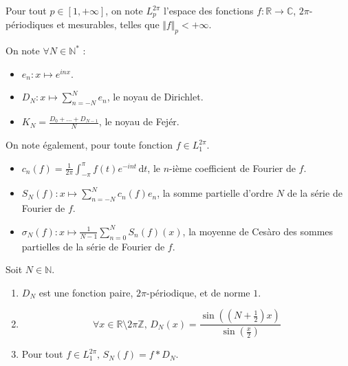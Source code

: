 





	\begin{notation}
		Pour tout $p \in [1, +\infty]$, on note $L_p^{2\pi}$ l'espace des fonctions $f : \mathbb{R} \rightarrow \mathbb{C}$, $2\pi$-périodiques et mesurables, telles que $\Vert f \Vert_p < +\infty$.
	\end{notation}

	\begin{notation}
		On note $\forall N \in \mathbb{N}^*$ :
		\begin{itemize}
			\item $e_n : x \mapsto e^{inx}$.
			\item $D_N : x \mapsto \sum_{n=-N}^N e_n$, le noyau de Dirichlet.
			\item $K_N = \frac{D_0 + \dots + D_{N-1}}{N}$, le noyau de Fejér.
		\end{itemize}
	\end{notation}

	\begin{notation}
		On note également, pour toute fonction $f \in L_1^{2\pi}$.
		\begin{itemize}
			\item $c_n(f) = \frac{1}{2\pi} \int_{- \pi}^\pi f(t) e^{-int} \, \mathrm{d}t$, le $n$-ième coefficient de Fourier de $f$.
			\item $S_N(f) : x \mapsto \sum_{n=-N}^N c_n(f) e_n$, la somme partielle d'ordre $N$ de la série de Fourier de $f$.
			\item $\sigma_N(f) : x \mapsto \frac{1}{N - 1} \sum_{n=0}^N S_n(f)(x)$, la moyenne de Cesàro des sommes partielles de la série de Fourier de $f$.
		\end{itemize}
	\end{notation}


	\begin{lemma}
		\label{theoreme-de-fejer-1}
		Soit $N \in \mathbb{N}$.
		\begin{enumerate}[label=(\roman*)]
			\item $D_N$ est une fonction paire, $2\pi$-périodique, et de norme $1$.
			\item \[ \forall x \in \mathbb{R} \setminus 2 \pi \mathbb{Z}, \, D_N(x) = \frac{\sin \left(\left( N + \frac{1}{2} \right) x \right)}{\sin \left( \frac{x}{2} \right)} \]
			\item Pour tout $f \in L_1^{2 \pi}, \, S_N(f) = f * D_N$.
		\end{enumerate}
	\end{lemma}

